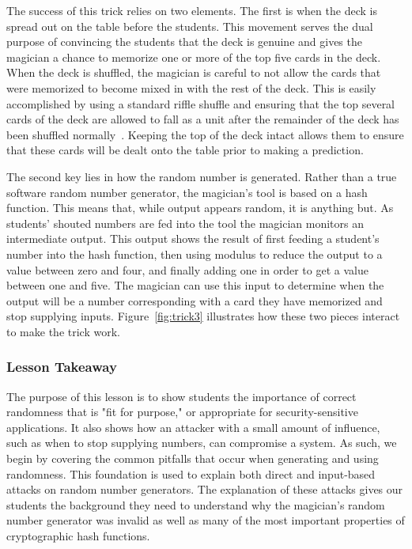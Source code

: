 The success of this trick relies on two elements.
The first is when the deck is spread out on the
table before the students.  This movement serves the dual purpose of convincing
the students that the deck is genuine and gives the magician a chance to
memorize one or more of the top five cards in the deck.
When the deck is
shuffled, the magician is careful to not allow the cards that were memorized to
become mixed in with the rest of the deck.  This is easily accomplished by
using a standard riffle shuffle and ensuring that the top several cards of
the deck are allowed to fall as a unit after the remainder of the deck has
been shuffled normally~\cite{wikishuffle}.
Keeping the top of the deck intact allows them to ensure that
these cards will be dealt onto the table prior to making a prediction.


The second key lies in how the random number is generated.
Rather than
a true software random number generator, the magician's tool is based on a hash
function.  This means that, while output appears random, it is anything but.
As students' shouted numbers are fed into the tool the magician monitors an
intermediate output.
This output shows the result of first feeding a student's number
into the hash function, then using modulus to reduce the output to a value
between zero and four, and finally adding one in order to get a value between
one and five.
The magician can use this input to determine when the output will be a number
corresponding with a card they have memorized and stop supplying inputs.
Figure~\ref{fig:trick3} illustrates how these two pieces interact to make
the trick work.


%

\subsubsection{Lesson Takeaway}

The purpose of this lesson is to show students the importance of correct
randomness
that is "fit for purpose," or appropriate for security-sensitive applications.
It also shows how an attacker
with a small amount of influence,
such as when to stop supplying numbers,
can compromise a
system.
As such, we begin by covering the common pitfalls
that occur when generating and
using randomness.
This foundation is used to explain both
direct and input-based attacks on random
number generators.
The explanation of these attacks gives our students the background they need to
understand why the magician's random number generator was invalid as well as
many of the most important properties of cryptographic hash functions.


